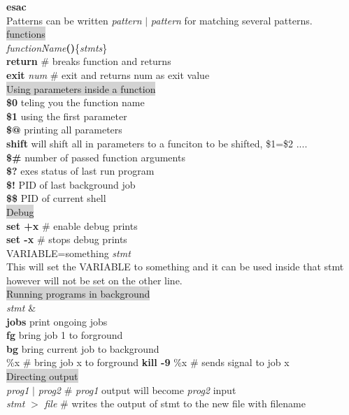 \documentclass[1pt]{proc}
\begin{document}
\begin{landscape}
\begin{multicols}{3}
\textbf{esac} \\
Patterns can be written \textit{pattern} $|$ \textit{pattern} for matching several patterns.\\
\colorbox{lightgray}{functions}\\
\textit{functionName}\textbf{()}\{\textit{stmts}\}\\
\textbf{return} \# breaks function and returns \\
\textbf{exit} \textit{num} \# exit and returns num as exit value \\
\colorbox{lightgray}{Using parameters inside a function}\\
\textbf{\$0} teling you the function name\\
\textbf{\$1} using the first parameter\\
\textbf{\$@} printing all parameters\\
\textbf{shift} will shift all in parameters to a funciton to be shifted, \$1=\$2 ....\\
\textbf{\$\#} number of passed function arguments  \\
\textbf{\$?} exes status of last run program\\
\textbf{\$!} PID of last background job \\
\textbf{\$\$} PID of current shell \\
\colorbox{lightgray}{Debug}\\
\textbf{set +x} \# enable debug prints\\
\textbf{set -x} \# stops debug prints\\
VARIABLE=something \textit{stmt} \\
This will set the VARIABLE to something and it can be used inside that stmt however will not be set on the other line.\\
\colorbox{lightgray}{Running programs in background}\\
\textit{stmt} \& \\
\textbf{jobs} print ongoing jobs\\
\textbf{fg} bring job 1 to forground\\
\textbf{bg} bring current job to background\\
\%x \# bring job x to forground
\textbf{kill -9} \%x \# sends signal to job x\\
\colorbox{lightgray}{Directing output}\\
\textit{prog1} $|$  \textit{prog2} \# \textit{prog1} output will become \textit{prog2} input\\
\textit{stmt} $>$ \textit{file} \# writes the output of stmt to the new file with filename\\

\end{multicols}
\end{landscape}
\end{document}
